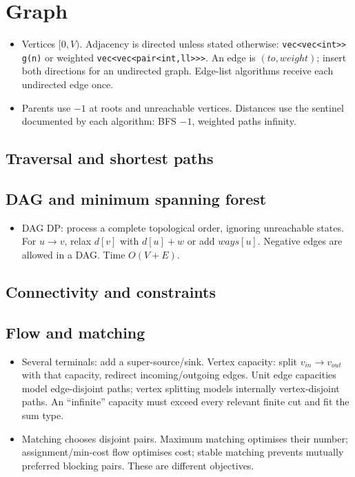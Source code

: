 \chapter{Graph}
\begin{itemize}[nosep,leftmargin=*]
\item Vertices $[0,V)$. Adjacency is directed unless stated otherwise:
\texttt{vec<vec<int>> g(n)} or weighted \texttt{vec<vec<pair<int,ll>>>}.
An edge is $(to,weight)$; insert both directions for an undirected graph.
Edge-list algorithms receive each undirected edge once.
\item Parents use $-1$ at roots and unreachable vertices. Distances use the
sentinel documented by each algorithm: BFS $-1$, weighted paths infinity.
\end{itemize}
\section{Traversal and shortest paths}
\section{DAG and minimum spanning forest}
\begin{itemize}[nosep,leftmargin=*]
\item DAG DP: process a complete topological order, ignoring unreachable
states. For $u\to v$, relax $d[v]$ with $d[u]+w$ or add $ways[u]$.
Negative edges are allowed in a DAG. Time $O(V+E)$.
\end{itemize}
\section{Connectivity and constraints}
\section{Flow and matching}
\begin{itemize}[nosep,leftmargin=*]
\item Several terminals: add a super-source/sink. Vertex capacity:
split $v_{in}\to v_{out}$ with that capacity, redirect incoming/outgoing
edges. Unit edge capacities model edge-disjoint paths; vertex splitting
models internally vertex-disjoint paths. An ``infinite'' capacity must
exceed every relevant finite cut and fit the sum type.
\item Matching chooses disjoint pairs. Maximum matching optimises their
number; assignment/min-cost flow optimises cost; stable matching prevents
mutually preferred blocking pairs. These are different objectives.
\end{itemize}
